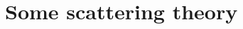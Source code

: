 \documentclass[
11pt, %
english, %
onehalfspacing, %
headsepline, %
]{MastersDoctoralThesis} %
\begin{document}












\mainmatter %

\pagestyle{thesis} %





\chapter{Some scattering theory} %
\end{document}

